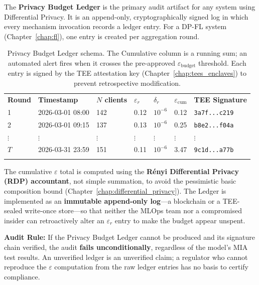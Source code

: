 The \textbf{Privacy Budget Ledger} is the primary audit artifact for any system using Differential Privacy. It is an append-only, cryptographically signed log in which every mechanism invocation records a ledger entry. For a DP-FL system (Chapter~\ref{chap:fl}), one entry is created per aggregation round.

\begin{table}[ht]
\centering
\caption{Privacy Budget Ledger schema. The Cumulative column is a running sum; an automated alert fires when it crosses the pre-approved $\varepsilon_{\text{budget}}$ threshold. Each entry is signed by the TEE attestation key (Chapter~\ref{chap:tees_enclaves}) to prevent retrospective modification.}
\label{tab:budget_ledger}
\renewcommand{\arraystretch}{1.25}
\begin{tabular}{p{1.0cm} p{2.0cm} p{1.5cm} p{1.5cm} p{1.8cm} p{1.8cm} p{2.5cm}}
\hline\noalign{\smallskip}
\textbf{Round} & \textbf{Timestamp} & \textbf{$N$ clients} & \textbf{$\varepsilon_r$} & \textbf{$\delta_r$} & \textbf{$\varepsilon_{\text{cum}}$} & \textbf{TEE Signature} \\
\noalign{\smallskip}\svhline\noalign{\smallskip}
1 & 2026-03-01 08:00 & 142 & 0.12 & $10^{-6}$ & 0.12 & \texttt{3a7f...c219} \\
2 & 2026-03-01 09:15 & 137 & 0.13 & $10^{-6}$ & 0.25 & \texttt{b8e2...f04a} \\
$\vdots$ & $\vdots$ & $\vdots$ & $\vdots$ & $\vdots$ & $\vdots$ & $\vdots$ \\
$T$ & 2026-03-31 23:59 & 151 & 0.11 & $10^{-6}$ & 3.47 & \texttt{9c1d...a77b} \\
\noalign{\smallskip}\hline\noalign{\smallskip}
\end{tabular}
\end{table}

The cumulative $\varepsilon$ total is computed using the \textbf{Rényi Differential Privacy (RDP) accountant}, not simple summation, to avoid the pessimistic basic composition bound (Chapter~\ref{chap:differential_privacy}). The Ledger is implemented as an \textbf{immutable append-only log}---a blockchain or a TEE-sealed write-once store---so that neither the MLOps team nor a compromised insider can retroactively alter an $\varepsilon_r$ entry to make the budget appear unspent.

\begin{svgraybox}
\textbf{Audit Rule:} If the Privacy Budget Ledger cannot be produced and its signature chain verified, the audit \textbf{fails unconditionally}, regardless of the model's MIA test results. An unverified ledger is an unverified claim; a regulator who cannot reproduce the $\varepsilon$ computation from the raw ledger entries has no basis to certify compliance.
\end{svgraybox}

